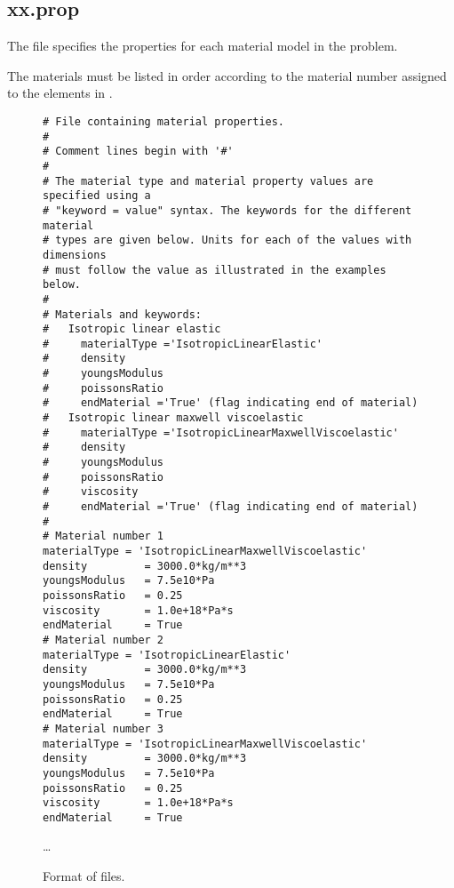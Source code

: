 \subsection{xx.prop}

The  file specifies the properties for each material
model in the problem.

\begin{warning}
  The materials must be listed in order according to the material
  number assigned to the elements in .
\end{warning}

\begin{figure}
  \begin{center}
\begin{verbatim}
# File containing material properties.
#
# Comment lines begin with '#'
#
# The material type and material property values are specified using a
# "keyword = value" syntax. The keywords for the different material
# types are given below. Units for each of the values with dimensions
# must follow the value as illustrated in the examples below.
#
# Materials and keywords:
#   Isotropic linear elastic
#     materialType ='IsotropicLinearElastic'
#     density
#     youngsModulus
#     poissonsRatio
#     endMaterial ='True' (flag indicating end of material)
#   Isotropic linear maxwell viscoelastic
#     materialType ='IsotropicLinearMaxwellViscoelastic'
#     density
#     youngsModulus
#     poissonsRatio
#     viscosity
#     endMaterial ='True' (flag indicating end of material)
#
# Material number 1
materialType = 'IsotropicLinearMaxwellViscoelastic'
density         = 3000.0*kg/m**3
youngsModulus   = 7.5e10*Pa
poissonsRatio   = 0.25
viscosity       = 1.0e+18*Pa*s
endMaterial     = True
# Material number 2
materialType = 'IsotropicLinearElastic'
density         = 3000.0*kg/m**3
youngsModulus   = 7.5e10*Pa
poissonsRatio   = 0.25
endMaterial     = True
# Material number 3
materialType = 'IsotropicLinearMaxwellViscoelastic'
density         = 3000.0*kg/m**3
youngsModulus   = 7.5e10*Pa
poissonsRatio   = 0.25
viscosity       = 1.0e+18*Pa*s
endMaterial     = True
\end{verbatim}
    \ldots
    \caption{Format of  files.}
  \end{center}
\end{figure}

